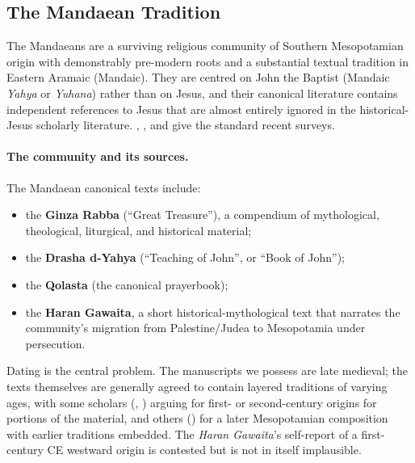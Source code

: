 \documentclass[12pt,oneside]{article}
\newcommand{\grk}[1]{\textit{#1}}   %
\begin{document}
\subsection{The {Mandaean} Tradition}
\label{sec:external:mandaean}

The Mandaeans are a surviving religious community of Southern
Mesopotamian origin with demonstrably pre-modern roots and a
substantial textual tradition in Eastern Aramaic (Mandaic).  They are
centred on John the Baptist (Mandaic \grk{Yahya} or \grk{Yuhana})
rather than on Jesus, and their canonical literature contains
independent references to Jesus that are almost entirely ignored in
the historical-Jesus scholarly literature.  \citet{Rudolph1978},
\citet{Lupieri2002}, and \citet{BuckleyMandaeans2002} give the
standard recent surveys.

\paragraph{The community and its sources.}
The Mandaean canonical texts include:
\begin{itemize}[leftmargin=2em]
\item the \textbf{Ginza Rabba} (\enquote{Great Treasure}), a
compendium of mythological, theological, liturgical, and
historical material;
\item the \textbf{Drasha d-Yahya} (\enquote{Teaching of John}, or
\enquote{Book of John});
\item the \textbf{Qolasta} (the canonical prayerbook);
\item the \textbf{Haran Gawaita}, a short historical-mythological
text that narrates the community's migration from Palestine/Judea
to Mesopotamia under persecution.
\end{itemize}
Dating is the central problem.  The manuscripts we possess are
late medieval; the texts themselves are generally agreed to contain
layered traditions of varying ages, with some scholars
(\citealt{Lidzbarski1925}, \citealt{BuckleyMandaeans2002}) arguing
for first- or second-century origins for portions of the material,
and others (\citealt{Lupieri2002}) for a later Mesopotamian
composition with earlier traditions embedded.  The \textit{Haran
Gawaita}'s self-report of a first-century CE westward origin is
contested but is not in itself implausible.
\end{document}

